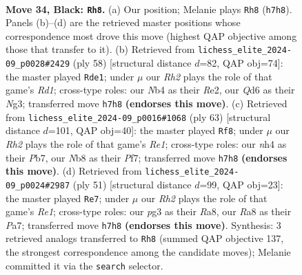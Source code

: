 \documentclass[11pt]{article}
\begin{document}
\clearpage

\begin{figure}[p]\centering
\begin{subfigure}{0.46\textwidth}\centering
\resizebox{\linewidth}{!}{%
\newchessgame
\chessboard[
  setfen={rnb5/1p4kr/2pqp3/p4p1p/PnpP1P1N/N5P1/1P1QB1KP/4R2R b - - 1 34},
  showmover=false,
  pgfstyle=straightmove, color=movearrow, markmove={h7-h8}
]}
\caption{}
\end{subfigure}\hfill
\begin{subfigure}{0.46\textwidth}\centering
\resizebox{\linewidth}{!}{%
\newchessgame
\chessboard[
  setfen={r3rbk1/5q1p/p2p2pP/1p3pB1/2nP4/P1P2QN1/1P2RP2/3R2K1 w - - 0 30},
  showmover=false,
  pgfstyle=straightmove, color=movearrow, markmove={d1-e1}
]}
\caption{}
\end{subfigure}
\\[4pt]
\begin{subfigure}{0.46\textwidth}\centering
\resizebox{\linewidth}{!}{%
\newchessgame
\chessboard[
  setfen={3rr1k1/1pq2pb1/p2p2pp/PnpP4/2N1P1P1/2PQ2BP/1P4K1/4RR2 b - - 0 32},
  showmover=false,
  pgfstyle=straightmove, color=movearrow, markmove={e8-f8}
]}
\caption{}
\end{subfigure}\hfill
\begin{subfigure}{0.46\textwidth}\centering
\resizebox{\linewidth}{!}{%
\newchessgame
\chessboard[
  setfen={r3r1k1/pp5b/2pn1qpR/3p1p2/3P1N2/1P2P1P1/P1PQ1KB1/7R b - - 3 26},
  showmover=false,
  pgfstyle=straightmove, color=movearrow, markmove={e8-e7}
]}
\caption{}
\end{subfigure}
\caption{\textbf{Move 34, Black: \texttt{Rh8}.} (a) Our position; Melanie plays \texttt{Rh8} (\texttt{h7h8}). Panels (b)--(d) are the retrieved master positions whose correspondence most drove this move (highest QAP objective among those that transfer to it). (b) Retrieved from \texttt{lichess\_elite\_2024-09\_p0028\#2429} (ply 58) [structural distance $d$=82, QAP obj=74]: the master played \texttt{Rde1}; under $\mu$ our \emph{Rh2} plays the role of that game's \emph{Rd1}; cross-type roles: our \emph{N}b4 as their \emph{R}e2, our \emph{Q}d6 as their \emph{N}g3; transferred move \texttt{h7h8} \textbf{(endorses this move)}. (c) Retrieved from \texttt{lichess\_elite\_2024-09\_p0016\#1068} (ply 63) [structural distance $d$=101, QAP obj=40]: the master played \texttt{Rf8}; under $\mu$ our \emph{Rh2} plays the role of that game's \emph{Re1}; cross-type roles: our \emph{n}h4 as their \emph{P}b7, our \emph{N}b8 as their \emph{P}f7; transferred move \texttt{h7h8} \textbf{(endorses this move)}. (d) Retrieved from \texttt{lichess\_elite\_2024-09\_p0024\#2987} (ply 51) [structural distance $d$=99, QAP obj=23]: the master played \texttt{Re7}; under $\mu$ our \emph{Rh2} plays the role of that game's \emph{Re1}; cross-type roles: our \emph{p}g3 as their \emph{R}a8, our \emph{R}a8 as their \emph{P}a7; transferred move \texttt{h7h8} \textbf{(endorses this move)}. Synthesis: 3 retrieved analogs transferred to \texttt{Rh8} (summed QAP objective 137, the strongest correspondence among the candidate moves); Melanie committed it via the \texttt{search} selector.}
\label{fig:thought-m67}
\end{figure}
\end{document}
